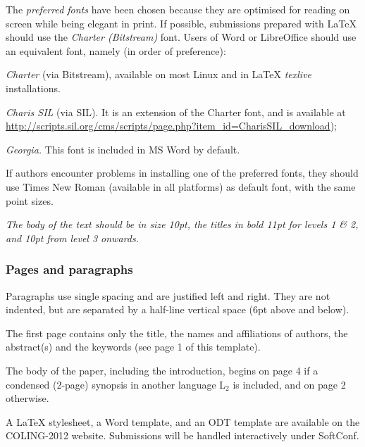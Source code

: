 \documentclass[10pt,a5paper,twoside]{article}
\begin{document}
The \emph{preferred fonts} have been chosen because they are optimised for reading on screen while being elegant in print. If possible, submissions prepared with LaTeX should use the \emph{Charter (Bitstream)} font. Users of Word or LibreOffice should use an equivalent font, namely (in order of preference):
\begin{compactenum}
\item\emph{Charter} (via Bitstream), available on most Linux and in LaTeX \emph{texlive} installations.
\item\emph{Charis SIL} (via SIL). It is an extension of the Charter font, and is available at \href{http://scripts.sil.org/cms/scripts/page.php?item_id=CharisSIL_download}
{http://scripts.sil.org/cms/scripts/page.php?item\_id=CharisSIL\_download}); 
\item\emph{Georgia.} This font is included  in MS Word by default.
\end{compactenum} 
If authors encounter problems in installing one of the preferred fonts, they should use Times New Roman (available in all platforms) as default font, with the same point sizes.

\emph{The body of the text should be in size 10pt, the titles in bold 11pt for levels 1 \& 2, and 10pt from level 3 onwards.}
\subsubsection{Pages and paragraphs}
Paragraphs use single spacing and are justified left and right. They are not indented, but are separated by a half-line vertical space (6pt above and below).

The first page contains only the title, the names and affiliations of authors, the abstract(s) and the keywords (see page 1 of this template).

The body of the paper, including the introduction, begins on page 4 if a condensed (2-page) synopsis in another language L$_{2}$ is included, and on page 2 otherwise. 

A LaTeX stylesheet, a Word template, and an ODT template are available on the COLING-2012 website. Submissions will be handled interactively under SoftConf. 
\end{document}
